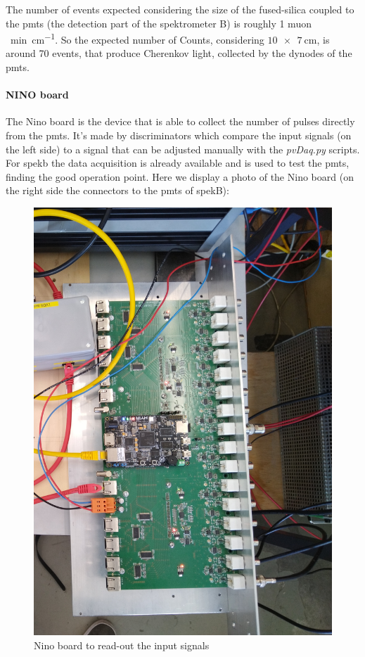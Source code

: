 \documentclass[10pt,a4paper]{article}
\begin{document}
The number of events expected considering the size of the fused-silica coupled to the pmts (the detection part of the spektrometer B) is roughly 1 muon \si{\per \minute \per \cm}. So the expected number of Counts, considering $\SI{10 x 7 }{ \centi \meter }$, is around 70 events, that produce Cherenkov light, collected by the dynodes of the pmts. 

\paragraph{NINO board}
The Nino board is the device that is able to collect the number of pulses directly from the pmts. It's made by discriminators which compare the input signals (on the left side) to a signal that can be adjusted manually with the \textit{pvDaq.py} scripts. For spekb the data acquisition is already available and is used to test the pmts, finding the good operation point. Here we display a photo of the Nino board (on the right side the connectors to the pmts of spekB):

\begin{figure}[hbtp]
\centering
\includegraphics[scale=0.08]{figures/IMG_20221102_193754.jpg}
\caption{Nino board to read-out the input signals}
\end{figure}
\end{document}
